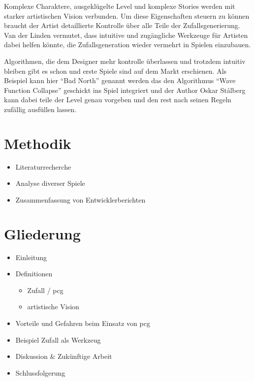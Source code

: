 \documentclass[10pt,a4paper]{article}
\begin{document}
\begin{multicols}{2}
Komplexe Charaktere, ausgeklügelte Level und komplexe Stories werden mit starker artistischen Vision verbunden. Um diese Eigenschaften steuern zu können braucht der Artist detaillierte Kontrolle über alle Teile der Zufallsgenerierung. Van der Linden vermutet, dass intuitive und zugängliche Werkzeuge für Artisten dabei helfen könnte, die Zufallsgeneration wieder vermehrt in Spielen einzubauen\cite{VanderLinden2014}.

Algorithmen, die dem Designer mehr kontrolle überlassen und trotzdem intuitiv bleiben gibt es schon und erste Spiele sind auf dem Markt erschienen. Als Beispiel kann hier “Bad North” genannt werden das den Algorithmus “Wave Function Collapse”\cite{Efros1999}\cite{Karth2017} geschickt ins Spiel integriert und der Author Oskar Stålberg kann dabei teile der Level genau vorgeben und den rest nach seinen Regeln zufällig ausfüllen lassen\cite{OskarStalberg2018}.
\end{multicols}

\section{Methodik}
\begin{itemize}
\item Literaturrecherche
\item Analyse diverser Spiele
\item Zusammenfassung von Entwicklerberichten
\end{itemize}

\section{Gliederung}

\begin{itemize}
\item Einleitung
\item Definitionen
\begin{itemize}
\item Zufall / \gls{pcg}
\item artistische Vision
\end{itemize}
\item Vorteile und Gefahren beim Einsatz von \gls{pcg}
\item Beispiel Zufall als Werkzeug
\item Diskussion \& Zukünftige Arbeit
\item Schlussfolgerung
\end{itemize}


%
%

%


\end{document}

